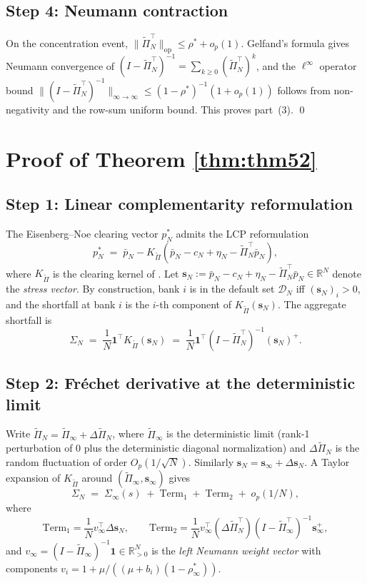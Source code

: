 \documentclass[11pt,a4paper]{article}
\theoremstyle{definition}
\newcommand{\SigmaN}{\Sigma_N}
\newcommand{\SigmaInf}{\Sigma_\infty}
\newcommand{\rhoStar}{\rho^\ast}
\newcommand{\rhoInf}{\rho_\infty^\ast}
\newcommand{\Dcal}{\mathcal{D}}
\newcommand{\DPi}{\Delta\widetilde{\Pi}}
\newcommand{\Kcal}{K_{\widetilde{\Pi}}}
\begin{document}
\subsection{Step 4: Neumann contraction}

On the concentration event, $\|\widetilde\Pi_N^\top\|_{\mathrm{op}}\leq
\rhoStar + o_p(1)$. Gelfand's formula gives Neumann convergence of
$(I - \widetilde\Pi_N^\top)^{-1} = \sum_{k\geq 0}(\widetilde\Pi_N^\top)^k$, and
the $\ell^\infty$ operator bound
$\|(I - \widetilde\Pi_N^\top)^{-1}\|_{\infty\to\infty}\leq(1-\rhoStar)^{-1}(1+o_p(1))$
follows from non-negativity and the row-sum uniform bound. This proves
part~(3). \qed

\section{Proof of Theorem \ref{thm:thm52}}
\label{sec:proof-52}

\subsection{Step 1: Linear complementarity reformulation}

The Eisenberg--Noe clearing vector $p^\ast_N$ admits the LCP reformulation
\[
p^\ast_N\;=\;\bar p_N - \Kcal(\bar p_N - c_N + \eta_N - \widetilde\Pi_N^\top\bar p_N),
\]
where $\Kcal$ is the clearing kernel of . Let
$\mathbf s_N := \bar p_N - c_N + \eta_N - \widetilde\Pi_N^\top\bar p_N
\in\mathbb{R}^N$ denote the \emph{stress vector}. By construction, bank $i$ is
in the default set $\Dcal_N$ iff $(\mathbf s_N)_i>0$, and the shortfall at
bank $i$ is the $i$-th component of $\Kcal(\mathbf s_N)$. The aggregate
shortfall is
\[
\SigmaN\;=\;\frac{1}{N}\mathbf 1^\top\Kcal(\mathbf s_N)\;=\;\frac{1}{N}\mathbf 1^\top(I - \widetilde\Pi_N^\top)^{-1}(\mathbf s_N)^+.
\]

\subsection{Step 2: Fr\'echet derivative at the deterministic limit}

Write $\widetilde\Pi_N = \widetilde\Pi_\infty + \DPi_N$, where
$\widetilde\Pi_\infty$ is the deterministic limit (rank-1 perturbation of
0 plus the deterministic diagonal normalization) and $\DPi_N$ is the
random fluctuation of order $O_p(1/\sqrt N)$. Similarly
$\mathbf s_N = \mathbf s_\infty + \Delta\mathbf s_N$. A Taylor expansion of
$\Kcal$ around $(\widetilde\Pi_\infty,\mathbf s_\infty)$ gives
\[
\SigmaN \;=\; \SigmaInf(s)\;+\;\mathrm{Term}_1\;+\;\mathrm{Term}_2\;+\;o_p(1/N),
\]
where
\[
\mathrm{Term}_1 = \frac{1}{N}v_\infty^\top\Delta\mathbf s_N,\qquad
\mathrm{Term}_2 = \frac{1}{N}v_\infty^\top(\DPi_N^\top)(I - \widetilde\Pi_\infty^\top)^{-1}\mathbf s_\infty^+,
\]
and $v_\infty = (I - \widetilde\Pi_\infty)^{-1}\mathbf 1\in\mathbb{R}^N_{>0}$
is the \emph{left Neumann weight vector} with components
$v_i = 1 + \mu/((\mu+b_i)(1-\rhoInf))$.
\end{document}
